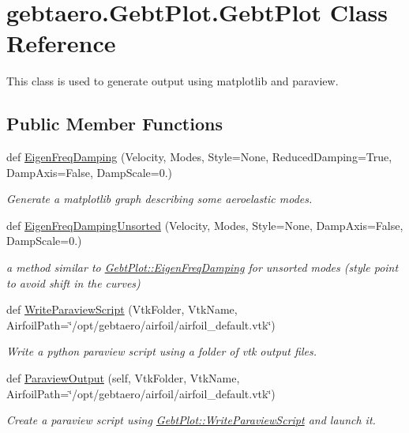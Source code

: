 \hypertarget{classgebtaero_1_1_gebt_plot_1_1_gebt_plot}{}\section{gebtaero.\+Gebt\+Plot.\+Gebt\+Plot Class Reference}
\label{classgebtaero_1_1_gebt_plot_1_1_gebt_plot}


This class is used to generate output using matplotlib and paraview.  


\subsection*{Public Member Functions}
\begin{DoxyCompactItemize}
\item 
def \hyperlink{classgebtaero_1_1_gebt_plot_1_1_gebt_plot_ab23ba97ff26906e6af80bff4e068327a}{Eigen\+Freq\+Damping} (Velocity, Modes, Style=None, Reduced\+Damping=True, Damp\+Axis=False, Damp\+Scale=0.)
\begin{DoxyCompactList}\small\item\em Generate a matplotlib graph describing some aeroelastic modes. \end{DoxyCompactList}\item 
def \hyperlink{classgebtaero_1_1_gebt_plot_1_1_gebt_plot_a3c71db3cc350d3befddb115ade755867}{Eigen\+Freq\+Damping\+Unsorted} (Velocity, Modes, Style=None, Damp\+Axis=False, Damp\+Scale=0.)
\begin{DoxyCompactList}\small\item\em a method similar to \hyperlink{classgebtaero_1_1_gebt_plot_1_1_gebt_plot_ab23ba97ff26906e6af80bff4e068327a}{Gebt\+Plot\+::\+Eigen\+Freq\+Damping} for unsorted modes (style point to avoid shift in the curves) \end{DoxyCompactList}\item 
def \hyperlink{classgebtaero_1_1_gebt_plot_1_1_gebt_plot_aada9da700e97eef6c59a4377098954af}{Write\+Paraview\+Script} (Vtk\+Folder, Vtk\+Name, Airfoil\+Path=\char`\"{}/opt/gebtaero/airfoil/airfoil\+\_\+default.\+vtk\char`\"{})
\begin{DoxyCompactList}\small\item\em Write a python paraview script using a folder of vtk output files. \end{DoxyCompactList}\item 
def \hyperlink{classgebtaero_1_1_gebt_plot_1_1_gebt_plot_ae78de8134989ce474d9a7d32b6f7e7c9}{Paraview\+Output} (self, Vtk\+Folder, Vtk\+Name, Airfoil\+Path=\char`\"{}/opt/gebtaero/airfoil/airfoil\+\_\+default.\+vtk\char`\"{})
\begin{DoxyCompactList}\small\item\em Create a paraview script using \hyperlink{classgebtaero_1_1_gebt_plot_1_1_gebt_plot_aada9da700e97eef6c59a4377098954af}{Gebt\+Plot\+::\+Write\+Paraview\+Script} and launch it. \end{DoxyCompactList}\end{DoxyCompactItemize}


